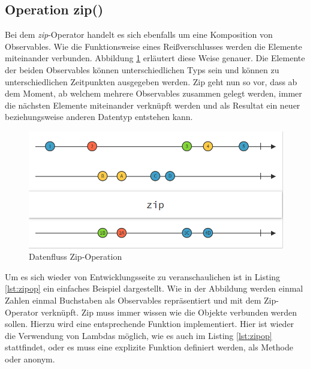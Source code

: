 \subsection{Operation zip()}
Bei dem \textit{zip}-Operator handelt es sich ebenfalls um eine Komposition von Observables. Wie die Funktionsweise eines Reißverschlusses werden die Elemente miteinander verbunden. Abbildung \ref{pic:zipop} erläutert diese Weise genauer. Die Elemente der beiden Observables können unterschiedlichen Typs sein und können zu unterschiedlichen Zeitpunkten ausgegeben werden. Zip geht nun so vor, dass ab dem Moment, ab welchem mehrere Observables zusammen gelegt werden, immer die nächsten Elemente miteinander verknüpft werden und als Resultat ein neuer beziehungsweise anderen Datentyp entstehen kann.
\begin{figure}[hbt]
	\centering
	\includegraphics[width=1\textwidth]{Abb/zip}
	\caption{Datenfluss Zip-Operation}
	\label{pic:zipop}
\end{figure}
 
Um es sich wieder von Entwicklungsseite zu veranschaulichen ist in Listing \ref{lst:zipop} ein einfaches Beispiel dargestellt. Wie in der Abbildung werden einmal Zahlen einmal Buchstaben als Observables repräsentiert und mit dem Zip-Operator verknüpft. Zip muss immer wissen wie die Objekte verbunden werden sollen. Hierzu wird eine entsprechende Funktion implementiert. Hier ist wieder die Verwendung von Lambdas möglich, wie es auch im Listing \ref{lst:zipop} stattfindet, oder es muss eine explizite Funktion definiert werden, als Methode oder anonym. 